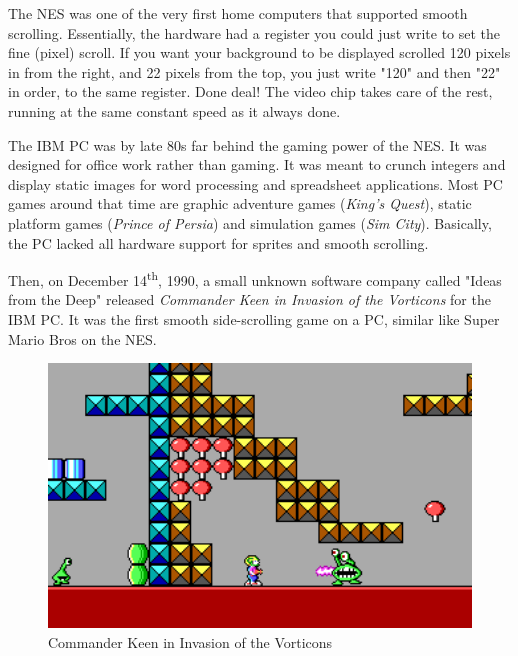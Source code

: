 \documentclass[book.tex]{subfiles}
\begin{document}
\par
The NES was one of the very first home computers that supported smooth scrolling. Essentially, the hardware had a register you could just write to set the fine (pixel) scroll. If you want your background to be displayed scrolled 120 pixels in from the right, and 22 pixels from the top, you just write "120" and then "22" in order, to the same register. Done deal! The video chip takes care of the rest, running at the same constant speed as it always done.\\
\par
The IBM PC was by late 80s far behind the gaming power of the NES. It was designed for office work rather than gaming. It was meant to crunch integers and display static images for word processing and spreadsheet applications. Most PC games around that time are graphic adventure games (\textit{King's Quest}), static platform games (\textit{Prince of Persia}) and simulation games (\textit{Sim City}). Basically, the PC lacked all hardware support for sprites and smooth scrolling.\\
\par
Then, on December 14\textsuperscript{th}, 1990, a small unknown software company called "Ideas from the Deep" released \textit{Commander Keen in Invasion of the Vorticons} for the IBM PC. It was the first smooth side-scrolling game on a PC, similar like Super Mario Bros on the NES. \\
\begin{figure}[H]
  \centering
 \includegraphics[width=1.0\textwidth]{screenshots_300dpi/Keen_Marooned_on_Mars_gameplay.png}
\caption{Commander Keen in Invasion of the Vorticons}
\end{figure}
\par
\end{document}
